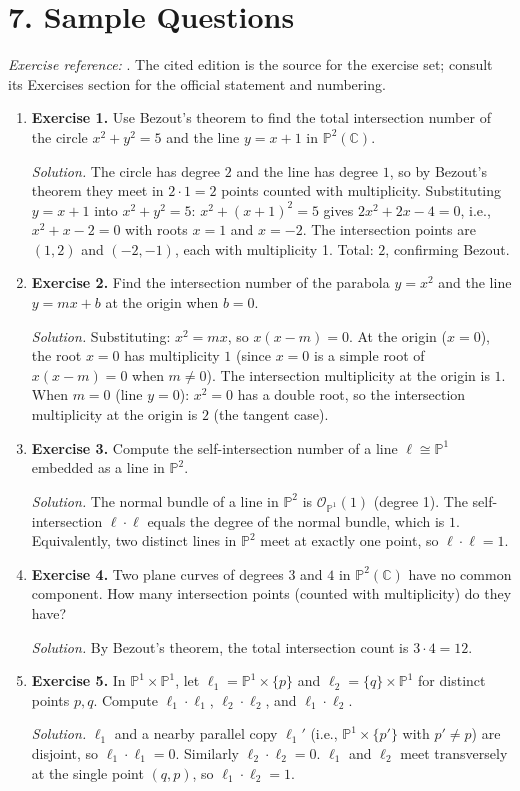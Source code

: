 \section*{7. Sample Questions}
\emph{Exercise reference:} \cite{intersection_theory_ref1}. The cited edition is the source for the exercise set; consult its Exercises section for the official statement and numbering.
\begin{enumerate}[leftmargin=*,itemsep=0.9em]
\item \textbf{Exercise 1.} Use Bezout's theorem to find the total intersection number of the circle $x^2+y^2=5$ and the line $y=x+1$ in $\mathbb{P}^2(\mathbb{C})$.

\emph{Solution.} The circle has degree $2$ and the line has degree $1$, so by Bezout's theorem they meet in $2\cdot 1=2$ points counted with multiplicity. Substituting $y=x+1$ into $x^2+y^2=5$: $x^2+(x+1)^2=5$ gives $2x^2+2x-4=0$, i.e., $x^2+x-2=0$ with roots $x=1$ and $x=-2$. The intersection points are $(1,2)$ and $(-2,-1)$, each with multiplicity 1. Total: $2$, confirming Bezout.

\item \textbf{Exercise 2.} Find the intersection number of the parabola $y=x^2$ and the line $y=mx+b$ at the origin when $b=0$.

\emph{Solution.} Substituting: $x^2=mx$, so $x(x-m)=0$. At the origin ($x=0$), the root $x=0$ has multiplicity $1$ (since $x=0$ is a simple root of $x(x-m)=0$ when $m\neq 0$). The intersection multiplicity at the origin is $1$. When $m=0$ (line $y=0$): $x^2=0$ has a double root, so the intersection multiplicity at the origin is $2$ (the tangent case).

\item \textbf{Exercise 3.} Compute the self-intersection number of a line $\ell\cong\mathbb{P}^1$ embedded as a line in $\mathbb{P}^2$.

\emph{Solution.} The normal bundle of a line in $\mathbb{P}^2$ is $\mathcal{O}_{\mathbb{P}^1}(1)$ (degree 1). The self-intersection $\ell\cdot\ell$ equals the degree of the normal bundle, which is $1$. Equivalently, two distinct lines in $\mathbb{P}^2$ meet at exactly one point, so $\ell\cdot\ell=1$.

\item \textbf{Exercise 4.} Two plane curves of degrees $3$ and $4$ in $\mathbb{P}^2(\mathbb{C})$ have no common component. How many intersection points (counted with multiplicity) do they have?

\emph{Solution.} By Bezout's theorem, the total intersection count is $3\cdot 4=12$.

\item \textbf{Exercise 5.} In $\mathbb{P}^1\times\mathbb{P}^1$, let $\ell_1=\mathbb{P}^1\times\{p\}$ and $\ell_2=\{q\}\times\mathbb{P}^1$ for distinct points $p,q$. Compute $\ell_1\cdot\ell_1$, $\ell_2\cdot\ell_2$, and $\ell_1\cdot\ell_2$.

\emph{Solution.} $\ell_1$ and a nearby parallel copy $\ell_1'$ (i.e., $\mathbb{P}^1\times\{p'\}$ with $p'\neq p$) are disjoint, so $\ell_1\cdot\ell_1=0$. Similarly $\ell_2\cdot\ell_2=0$. $\ell_1$ and $\ell_2$ meet transversely at the single point $(q,p)$, so $\ell_1\cdot\ell_2=1$.

\end{enumerate}

